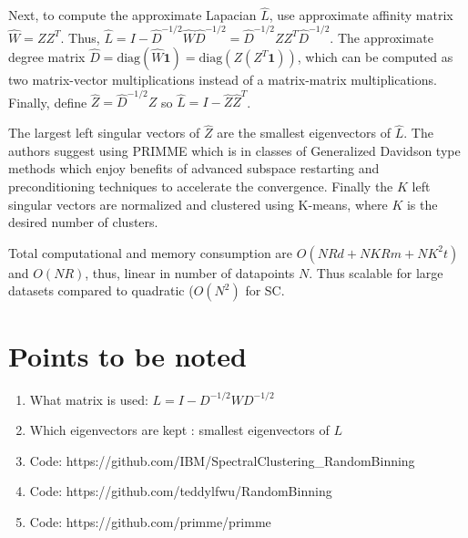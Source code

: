 \documentclass[10pt,a4paper,twoside]{report}
\theoremstyle{definition}
\begin{document}
	Next, to compute the approximate Lapacian $\hat{L}$, use approximate affinity matrix $\hat{W} = ZZ^T$. Thus, $\hat{L} = I-\hat{D}^{-1/2}\hat{W}\hat{D}^{-1/2} = \hat{D}^{-1/2}ZZ^T\hat{D}^{-1/2}$. The approximate degree matrix $\hat{D} = \text{diag}(\hat{W}\mathbf{1}) = \text{diag}(Z(Z^T\mathbf1))$, which can be computed as two matrix-vector multiplications instead of a matrix-matrix multiplications. Finally, define $\hat{Z} = \hat{D}^{-1/2}Z$ so $\hat{L}=I-\hat{Z}\hat{Z}^T$.
	
	The largest left singular vectors of $\hat{Z}$ are the smallest eigenvectors of $\hat{L}$. The authors suggest using PRIMME which is in classes of Generalized Davidson type methods which enjoy benefits of advanced subspace restarting and preconditioning techniques to accelerate the convergence. Finally the $K$ left singular vectors are normalized and clustered using K-means, where $K$ is the desired number of clusters.
	
	Total computational and memory consumption are $O(NRd+NKRm+NK^2t)$ and $O(NR)$, thus, linear in number of datapoints $N$. Thus scalable for large datasets compared to quadratic ($O(N^2)$ for SC.
	
	\section*{Points to be noted}
	\begin{enumerate}
		\item What matrix is used: $L=I-D^{-1/2}WD^{-1/2}$
		\item Which eigenvectors are kept : smallest eigenvectors of $L$
		\item Code: https://github.com/IBM/SpectralClustering\_RandomBinning
		\item Code: https://github.com/teddylfwu/RandomBinning
		\item Code: https://github.com/primme/primme
	\end{enumerate}	
	
\end{document}
